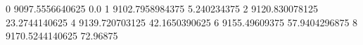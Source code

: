 0 9097.5556640625 0.0
1 9102.7958984375 5.240234375
2 9120.830078125 23.2744140625
4 9139.720703125 42.1650390625
6 9155.49609375 57.9404296875
8 9170.5244140625 72.96875
